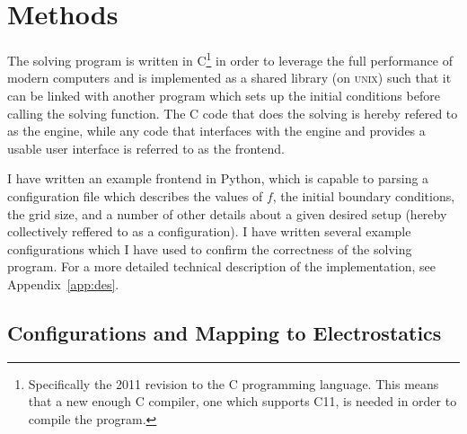\section{Methods}

The solving program is written in C\footnote{Specifically the 2011 revision to the C programming language. This means that a new enough
C compiler, one which supports C11, is needed in order to compile the program.} in order to leverage the full performance of modern computers and is implemented
as a shared library (on \textsc{unix}) such that it can be linked with another program which sets up the initial conditions
before calling the solving function. The C code that does the solving is hereby refered to as the engine, while any code
that interfaces with the engine and provides a usable user interface is referred to as the frontend.

I have written an example frontend in Python, which is capable to parsing a configuration file which describes the
values of $f$, the initial boundary conditions, the grid size, and a number of other details about a given desired
setup (hereby collectively reffered to as a configuration). I have written several example configurations which I have used to
confirm the correctness of the solving program. For a more detailed technical description of the implementation, see Appendix~\ref{app:des}.









\subsection{Configurations and Mapping to Electrostatics}


